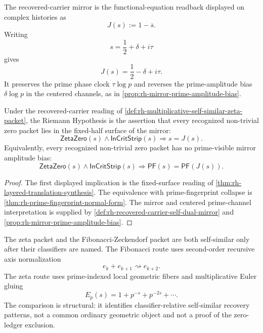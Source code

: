 \begin{definition}
\label{def:rh-recovered-carrier-self-dual-mirror}
The recovered-carrier mirror is the functional-equation readback
displayed on complex histories as
$$
J(s):=1-\overline{s}.
$$
Writing
$$
s=\frac12+\delta+i\tau
$$
gives
$$
J(s)=\frac12-\delta+i\tau.
$$
It preserves the prime phase clock $\tau\log p$ and reverses the
prime-amplitude bias $\delta\log p$ in the centered channels, as in
\autoref{prop:rh-mirror-prime-amplitude-bias}.
\end{definition}

\begin{theorem}
\label{thm:rh-self-similar-carrier-fixed-half-zero-ledger}
Under the recovered-carrier reading of
\autoref{def:rh-multiplicative-self-similar-zeta-packet}, the Riemann
Hypothesis is the assertion that every recognized non-trivial zero
packet lies in the fixed-half surface of the mirror:
$$
\mathsf{ZetaZero}(s)\wedge\mathsf{InCritStrip}(s)
\Longrightarrow
s=J(s).
$$
Equivalently, every recognized non-trivial zero packet has no
prime-visible mirror amplitude bias:
$$
\mathsf{ZetaZero}(s)\wedge\mathsf{InCritStrip}(s)
\Longrightarrow
\mathsf{PF}(s)=\mathsf{PF}(J(s)).
$$
\end{theorem}

\begin{proof}
The first displayed implication is the fixed-surface reading of
\autoref{thm:rh-layered-translation-synthesis}. The equivalence with
prime-fingerprint collapse is
\autoref{thm:rh-prime-fingerprint-normal-form}. The mirror and centered
prime-channel interpretation is supplied by
\autoref{def:rh-recovered-carrier-self-dual-mirror} and
\autoref{prop:rh-mirror-prime-amplitude-bias}.
\end{proof}

\begin{principle}
\label{prin:rh-zeta-fibonacci-self-similar-comparison-boundary}
The zeta packet and the Fibonacci-Zeckendorf packet are both
self-similar only after their classifiers are named. The Fibonacci route
uses second-order recursive axis normalization
$$
e_k+e_{k+1}\rightsquigarrow e_{k+2}.
$$
The zeta route uses prime-indexed local geometric fibers and
multiplicative Euler gluing
$$
E_p(s)=1+p^{-s}+p^{-2s}+\cdots.
$$
The comparison is structural: it identifies classifier-relative
self-similar recovery patterns, not a common ordinary geometric object
and not a proof of the zero-ledger exclusion.
\end{principle}

